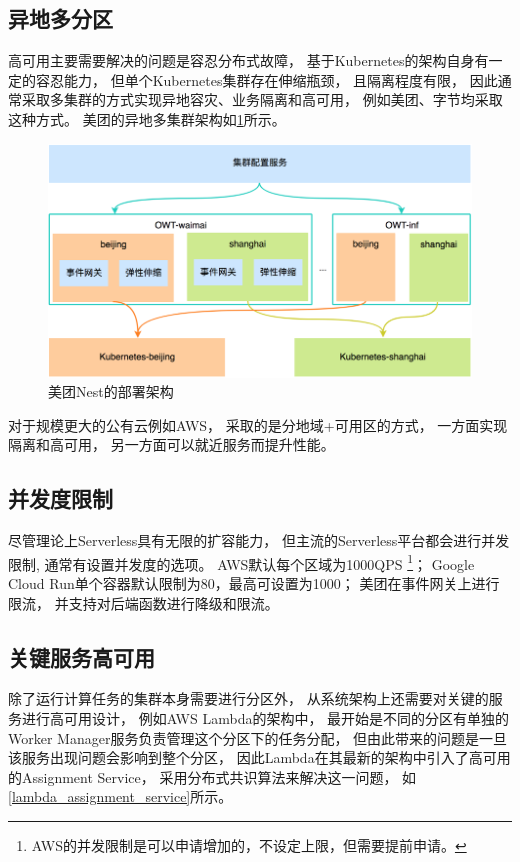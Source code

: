 \subsection{异地多分区}
高可用主要需要解决的问题是容忍分布式故障，
基于Kubernetes的架构自身有一定的容忍能力，
但单个Kubernetes集群存在伸缩瓶颈\cite{k8s_large_cluster}，
且隔离程度有限，
因此通常采取多集群的方式实现异地容灾、业务隔离和高可用，
例如美团、字节均采取这种方式\cite{meituan_serverless_nest, bytedance_faas}。
美团的异地多集群架构如\cref{nest_deploy_arch}所示。

\begin{figure}[ht!]
    \centering
    \includegraphics[width=0.7\linewidth]{images/nest_k8s_arch.png}
    \caption{美团Nest的部署架构}
    \label{nest_deploy_arch}
\end{figure}

对于规模更大的公有云例如AWS，
采取的是分地域+可用区的方式，
一方面实现隔离和高可用，
另一方面可以就近服务而提升性能\cite{aws_global_infra}。

\subsection{并发度限制}
尽管理论上Serverless具有无限的扩容能力，
但主流的Serverless平台都会进行并发限制,
通常有设置并发度的选项。
AWS默认每个区域为1000QPS
\footnote{AWS的并发限制是可以申请增加的，不设定上限，但需要提前申请。}\cite{lambda_concurrency}；
Google Cloud Run单个容器默认限制为80，最高可设置为1000\cite{google_cloud_run_concurrency}；
美团在事件网关上进行限流，
并支持对后端函数进行降级和限流\cite{meituan_serverless_nest}。

\subsection{关键服务高可用}
除了运行计算任务的集群本身需要进行分区外，
从系统架构上还需要对关键的服务进行高可用设计，
例如AWS Lambda的架构中，
最开始是不同的分区有单独的Worker Manager服务负责管理这个分区下的任务分配，
但由此带来的问题是一旦该服务出现问题会影响到整个分区，
因此Lambda在其最新的架构中引入了高可用的Assignment Service，
采用分布式共识算法来解决这一问题，
如\cref{lambda_assignment_service}所示。

